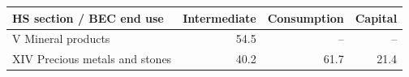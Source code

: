 \begin{tabular}{lrrr}
\toprule
HS section / BEC end use & Intermediate & Consumption & Capital \\
\midrule
V Mineral products & 54.5 & -- & -- \\
XIV Precious metals and stones & 40.2 & 61.7 & 21.4 \\
\bottomrule
\end{tabular}

